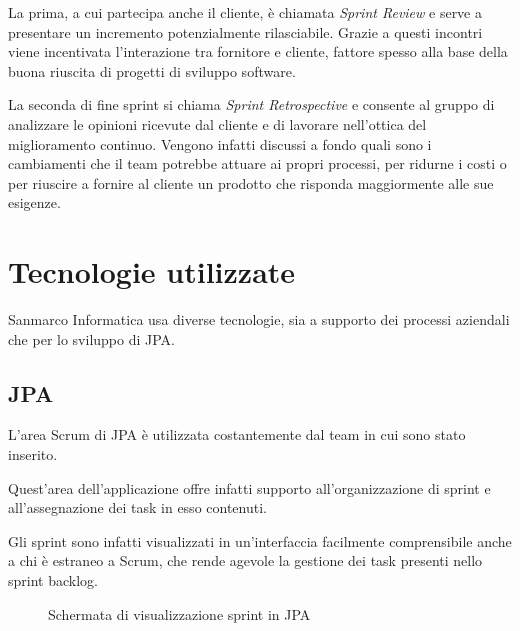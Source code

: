 La prima, a cui partecipa anche il cliente, è chiamata \emph{Sprint Review} e
serve a presentare un incremento potenzialmente rilasciabile. Grazie
a questi incontri viene incentivata l'interazione tra fornitore e cliente,
fattore spesso alla base della buona riuscita di progetti di sviluppo software.

La seconda  di fine sprint si chiama \emph{Sprint
Retrospective} e consente al gruppo di analizzare le opinioni ricevute dal
cliente e di lavorare nell'ottica del miglioramento continuo. Vengono infatti
discussi a fondo quali sono i cambiamenti che il team potrebbe attuare ai
propri processi, per ridurne i costi o per riuscire a fornire al cliente un
prodotto che risponda maggiormente alle sue esigenze.
\section{Tecnologie utilizzate}

Sanmarco Informatica usa diverse tecnologie, sia a supporto dei processi
aziendali che per lo sviluppo di JPA.

\subsection{JPA}

L'area Scrum di JPA è utilizzata costantemente dal team in cui sono stato
inserito.

Quest'area dell'applicazione offre infatti supporto all'organizzazione di
sprint e all'assegnazione dei task in esso contenuti.

Gli sprint sono infatti visualizzati in un'interfaccia facilmente comprensibile
anche a chi è estraneo a Scrum, che rende agevole la gestione dei task presenti
nello sprint backlog.

\begin{figure}%
  \noindent{}%
  \caption{Schermata di visualizzazione sprint in JPA}%
  \label{fig:jpa-viewer}%
\end{figure}

